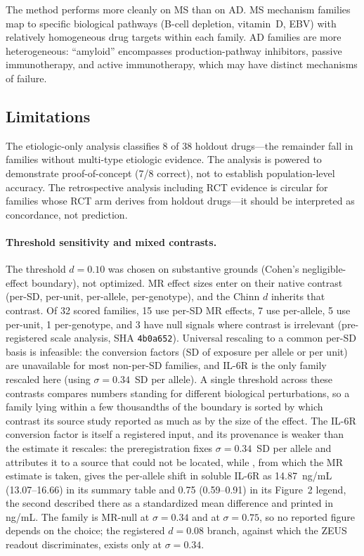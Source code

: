 \documentclass[11pt]{article}
\begin{document}
The method performs more cleanly on MS than on AD. MS mechanism families map to specific biological pathways (B-cell depletion, vitamin~D, EBV) with relatively homogeneous drug targets within each family. AD families are more heterogeneous: ``amyloid'' encompasses production-pathway inhibitors, passive immunotherapy, and active immunotherapy, which may have distinct mechanisms of failure.

\subsection{Limitations}
\label{sec:limitations}

The etiologic-only analysis classifies 8 of 38 holdout drugs---the remainder fall in families without multi-type etiologic evidence. The analysis is powered to demonstrate proof-of-concept (7/8 correct), not to establish population-level accuracy. The retrospective analysis including RCT evidence is circular for families whose RCT arm derives from holdout drugs---it should be interpreted as concordance, not prediction.

\paragraph{Threshold sensitivity and mixed contrasts.} The threshold $d = 0.10$ was chosen on substantive grounds (Cohen's negligible-effect boundary), not optimized. MR effect sizes enter on their native contrast (per-SD, per-unit, per-allele, per-genotype), and the Chinn $d$ inherits that contrast. Of 32 scored families, 15 use per-SD MR effects, 7 use per-allele, 5 use per-unit, 1 per-genotype, and 3 have null signals where contrast is irrelevant (pre-registered scale analysis, SHA \texttt{4b0a652}). Universal rescaling to a common per-SD basis is infeasible: the conversion factors (SD of exposure per allele or per unit) are unavailable for most non-per-SD families, and IL-6R is the only family rescaled here (using $\sigma = 0.34$~SD per allele). A single threshold across these contrasts compares numbers standing for different biological perturbations, so a family lying within a few thousandths of the boundary is sorted by which contrast its source study reported as much as by the size of the effect. The IL-6R conversion factor is itself a registered input, and its provenance is weaker than the estimate it rescales: the preregistration fixes $\sigma = 0.34$~SD per allele and attributes it to a source that could not be located, while \citet{interleukin2012}, from which the MR estimate is taken, gives the per-allele shift in soluble IL-6R as 14.87~ng/mL (13.07--16.66) in its summary table and 0.75 (0.59--0.91) in its Figure~2 legend, the second described there as a standardized mean difference and printed in ng/mL. The family is MR-null at $\sigma = 0.34$ and at $\sigma = 0.75$, so no reported figure depends on the choice; the registered $d = 0.08$ branch, against which the ZEUS readout discriminates, exists only at $\sigma = 0.34$.
\end{document}
